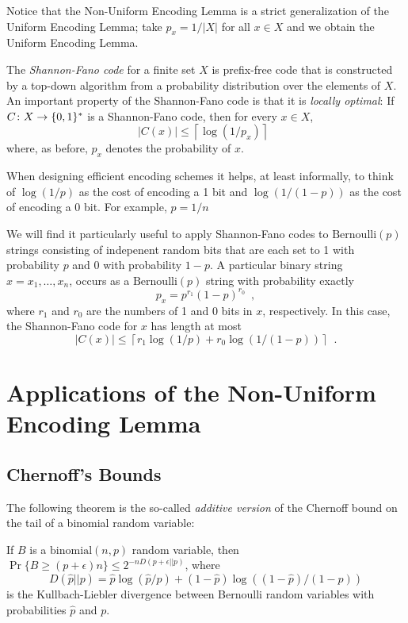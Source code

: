 \documentclass{patmorin}
\begin{document}
Notice that the Non-Uniform Encoding Lemma is a strict generalization
of the Uniform Encoding Lemma; take $p_x=1/|X|$ for all $x\in X$
and we obtain the Uniform Encoding Lemma.

The \emph{Shannon-Fano code} \cite{fano:transmission,shannon:mathematical}
for a finite set $X$ is prefix-free code that is constructed by a top-down
algorithm from a probability distribution over the elements of $X$. An
important property of the Shannon-Fano code is that it is \emph{locally
optimal}: If $C\colon X\to\{0,1\}^*$ is a Shannon-Fano code, then for every $x\in X$,
\[
    |C(x)| \le \left\lceil\log(1/p_x)\right\rceil \enspace 
\]
where, as before, $p_x$ denotes the probability of $x$.

When designing efficient encoding schemes it helps, at least
informally, to think of $\log(1/p)$ as the cost of encoding a 1 bit and
$\log(1/(1-p))$ as the cost of encoding a 0 bit.  For example, $p=1/n$

We will find it particularly useful to apply Shannon-Fano codes to
$\mathrm{Bernoulli}(p)$ strings consisting of indepenent random bits that
are each set to 1 with probability $p$ and 0 with probability $1-p$.
A particular binary string $x=x_1,\ldots,x_n$, occurs as
a $\mathrm{Bernoulli}(p)$ string with
probability exactly
\[
   p_x= p^{r_1}(1-p)^{r_0} \enspace ,
\]
where $r_1$ and $r_0$ are the numbers of 1 and 0 bits in $x$, respectively. In this case, the Shannon-Fano code for $x$ has length at most
\[
    |C(x)|\le \left\lceil r_1\log (1/p) + r_0\log(1/(1-p)) \right\rceil \enspace .
\]


\section{Applications of the Non-Uniform Encoding Lemma}

\subsection{Chernoff's Bounds}

The following theorem is the so-called \emph{additive version} of the
Chernoff bound on the tail of a binomial random variable:

\begin{thm}
  If $B$ is a $\mathrm{binomial}(n,p)$ random variable, then $\Pr\{B\ge
  (p+\epsilon)n\} \le 2^{-nD(p+\epsilon||p)}$, where 
  \[ 
    D(\hat p||p)=\hat p\log(\hat p/p) + (1-\hat p)\log((1-\hat p)/(1-p)) 
  \] is
  the Kullbach-Liebler divergence between Bernoulli random variables
  with probabilities $\hat p$ and $p$.
\end{thm}
\end{document}
